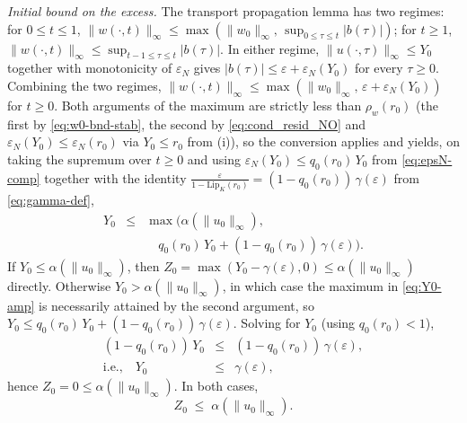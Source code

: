 \documentclass[twocolumn,amsthm]{autart}
\newcommand{\Lipk}{\mathrm{Lip}_K}
\newcommand{\eps}{\varepsilon}
\theoremstyle{plain}
\theoremstyle{definition}
\begin{document}
\emph{Initial bound on the excess.} The transport propagation lemma has two regimes: for $0 \le t \le 1$, $\|w(\cdot,t)\|_\infty \le \max(\|w_0\|_\infty,\, \sup_{0\le\tau\le t}|b(\tau)|)$; for $t \ge 1$, $\|w(\cdot,t)\|_\infty \le \sup_{t-1\le\tau\le t}|b(\tau)|$. In either regime, $\|u(\cdot,\tau)\|_\infty \le Y_0$ together with monotonicity of $\eps_N$ gives $|b(\tau)| \le \eps + \eps_N(Y_0)$ for every $\tau \ge 0$. Combining the two regimes, $\|w(\cdot,t)\|_\infty \le \max(\|w_0\|_\infty,\, \eps + \eps_N(Y_0))$ for $t \ge 0$. Both arguments of the maximum are strictly less than $\rho_w(r_0)$ (the first by \eqref{eq:w0-bnd-stab}, the second by \eqref{eq:cond_resid_NO} and $\eps_N(Y_0) \le \eps_N(r_0)$ via $Y_0 \le r_0$ from (i)), so the conversion applies and yields, on taking the supremum over $t \ge 0$ and using $\eps_N(Y_0) \le q_0(r_0)\,Y_0$ from \eqref{eq:epsN-comp} together with the identity $\frac{\eps}{1-\Lipk(r_0)} = (1-q_0(r_0))\,\gamma(\eps)$ from \eqref{eq:gamma-def},
\begin{eqnarray}
Y_0 &\le& \max\bigl(\alpha(\|u_0\|_\infty), \nonumber \\
&& \quad q_0(r_0)\,Y_0 + (1-q_0(r_0))\,\gamma(\eps)\bigr).
\label{eq:Y0-amp}
\end{eqnarray}
If $Y_0 \le \alpha(\|u_0\|_\infty)$, then $Z_0 = \max(Y_0 - \gamma(\eps), 0) \le \alpha(\|u_0\|_\infty)$ directly. Otherwise $Y_0 > \alpha(\|u_0\|_\infty)$, in which case the maximum in \eqref{eq:Y0-amp} is necessarily attained by the second argument, so $Y_0 \le q_0(r_0)\,Y_0 + (1-q_0(r_0))\,\gamma(\eps)$. Solving for $Y_0$ (using $q_0(r_0) < 1$),
\begin{eqnarray}
(1-q_0(r_0))\,Y_0 &\le& (1-q_0(r_0))\,\gamma(\eps), \nonumber \\
\text{i.e.,} \quad Y_0 &\le& \gamma(\eps),
\label{eq:Y0-case2}
\end{eqnarray}
hence $Z_0 = 0 \le \alpha(\|u_0\|_\infty)$. In both cases,
\begin{equation}
Z_0 \;\le\; \alpha(\|u_0\|_\infty).
\label{eq:Z0-bound}
\end{equation}
\end{document}
